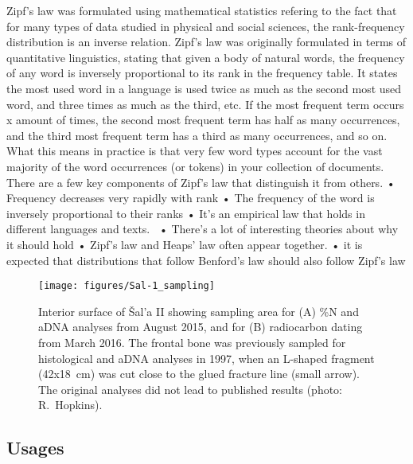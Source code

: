 \documentclass[a4paper,10pt]{article}
\begin{document}
Zipf’s law was formulated using mathematical statistics refering to the fact that for many types of data studied in  physical and social sciences, the rank-frequency distribution is an inverse relation.  Zipf's law was originally formulated in terms of quantitative linguistics, stating that given a body of natural words, the frequency of any word is inversely proportional to its rank in the frequency table.  It states the most used word in a language is used twice as much as the second most used word, and three times as much as the third, etc. If the most frequent term occurs x amount of times, the second most frequent term has half as many occurrences, and the third most frequent term has a third as many occurrences, and so on.  What this means in practice is that very few word types account for the vast majority of the word occurrences (or tokens) in your collection of documents. There are a few key components of Zipf’s law that distinguish it from others. 
• Frequency decreases very rapidly with rank
• The frequency of the word is inversely proportional to their ranks
• It’s an empirical law that holds in different languages and texts. 
• There’s a lot of interesting theories about why it should hold
• Zipf's law and Heaps' law often appear together.
• it is expected that distributions that follow Benford’s law should also follow Zipf’s law

	\begin{figure}[t]
		\centering
		\texttt{[image: figures/Sal-1\_sampling]}
		\caption{Interior surface of Šal'a II showing sampling area for (A) \%N and aDNA analyses from August 2015, and for (B) radiocarbon dating from March 2016. The frontal bone was previously sampled for histological and aDNA analyses in 1997, when an L-shaped fragment (42x18~cm) was cut close to the glued fracture line (small arrow). The original analyses did not lead to published results (photo: R.~Hopkins).}
		\label{fig:Sal-II}
	\end{figure}

\subsection{Usages}
\end{document}
